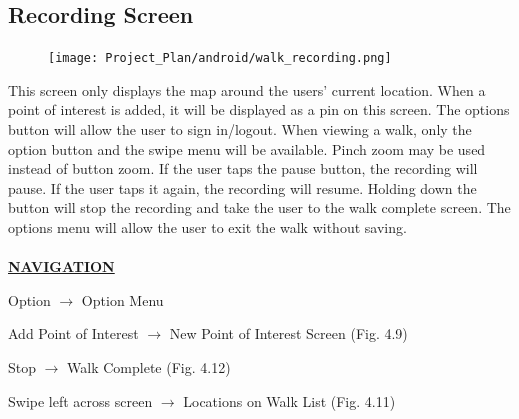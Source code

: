 \documentclass[12pt]{article}
\begin{document}
\subsection{Recording Screen}
\begin{figure}[htp]
\centering
\texttt{[image: Project\_Plan/android/walk\_recording.png]}
\caption{}
\label{}
\end{figure}
\par{This screen only displays the map around the users’ current location. When a point of interest is added, it will be displayed as a pin on this screen. The options button will allow the user to sign in/logout. When viewing a walk, only the option button and the swipe menu will be available. Pinch zoom may be used instead of button zoom. If the user taps the pause button, the recording will pause. If the user taps it again, the recording will resume. Holding down the button will stop the recording and take the user to the walk complete screen. The options menu will allow the user to exit the walk without saving. \\ \\}
\textbf{\uline{NAVIGATION}}
\par{Option $\rightarrow$ Option Menu}
\par{Add Point of Interest $\rightarrow$ New Point of Interest Screen (Fig. 4.9)}
\par{Stop $\rightarrow$ Walk Complete (Fig. 4.12)}
\par{Swipe left across screen $\rightarrow$ Locations on Walk List (Fig. 4.11)}
\end{document}
